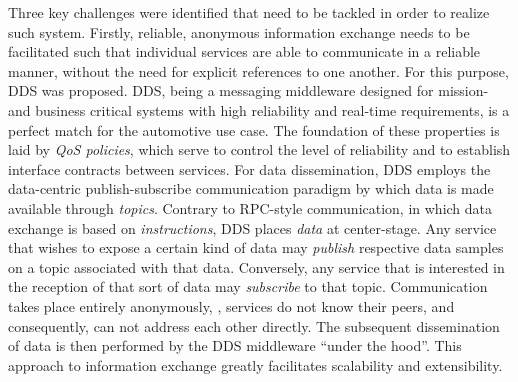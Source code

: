 Three key challenges were identified that need to be tackled in order to realize such system. Firstly, reliable, anonymous information exchange needs to be facilitated such that individual services are able to communicate in a reliable manner, without the need for explicit references to one another. For this purpose, DDS was proposed. DDS, being a messaging middleware designed for mission- and business critical systems with high reliability and real-time requirements, is a perfect match for the automotive use case.
The foundation of these properties is laid by \emph{QoS policies}, which serve to control the level of reliability and to establish interface contracts between services. For data dissemination, DDS employs the data-centric publish-subscribe communication paradigm by which data is made available through \emph{topics}. Contrary to RPC-style communication, in which data exchange is based on \emph{instructions}, DDS places \emph{data} at center-stage. Any service that wishes to expose a certain kind of data may \emph{publish} respective data samples on a topic associated with that data. Conversely, any service that is interested in the reception of that sort of data may \emph{subscribe} to that topic. Communication takes place entirely anonymously, \ie, services do not know their peers, and consequently, can not address each other directly. The subsequent dissemination of data is then performed by the DDS middleware ``under the hood''. This approach to information exchange greatly facilitates scalability and extensibility.

